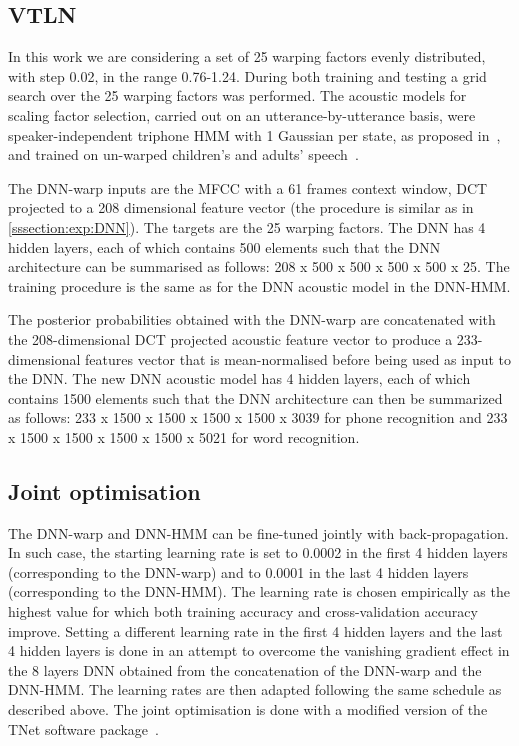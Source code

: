 \documentclass{nle}
\begin{document}
\subsection{VTLN}\label{sssection:exp:VTLN}
In  this  work  we are considering  a  set   of  25  warping   factors  evenly
distributed, with step 0.02, in the range 0.76-1.24. During both training and testing
a grid search over the 25 warping factors was performed.  The acoustic
models   for   scaling   factor    selection,   carried   out   on   an
utterance-by-utterance  basis, were speaker-independent  triphone HMM
with  1 Gaussian  per state, as proposed in~\citep{WelKanNey99},   and  trained on  un-warped children's  and
adults' speech~\citep{GerGiuBru07,GerGiuBru09}.

The DNN-warp inputs are the MFCC with a 61 frames context window, DCT
projected to a 208 dimensional feature vector (the procedure is similar as in \ref{sssection:exp:DNN}). The targets are the 25
warping factors. The  DNN has 4 hidden layers,  each of which contains
500  elements such  that the  DNN  architecture can  be summarised  as
follows: 208 x 500  x 500 x 500 x 500 x  25. The training procedure is
the same as for the DNN  acoustic model in the DNN-HMM.  

The posterior
probabilities  obtained with  the  DNN-warp are concatenated with  the
208-dimensional DCT  projected acoustic  feature vector to produce a
233-dimensional features  vector that is mean-normalised  before being used
as input to  the DNN. The new DNN acoustic model  has 4 hidden layers,
each of  which contains 1500  elements such that the  DNN architecture
can then be summarized  as follows: 233 x 1500 x 1500  x 1500 x 1500 x
3039 for phone recognition and 233 x 1500 x 1500  x 1500 x 1500 x 5021 for word recognition.

\subsection{Joint optimisation}\label{sssection:exp:joint}
The DNN-warp and DNN-HMM can be fine-tuned jointly with back-propagation. In such case, the starting learning rate is set to 0.0002 in the first 4 hidden layers (corresponding to the DNN-warp) and to 0.0001 in the last 4 hidden layers (corresponding to the DNN-HMM). The learning rate is chosen empirically as the highest value for which both training accuracy and cross-validation accuracy improve. Setting a different learning rate in the first 4 hidden layers and the last 4 hidden layers is done in an attempt to overcome the vanishing gradient effect in the 8 layers DNN obtained from the concatenation of the DNN-warp and the DNN-HMM. The learning rates are then adapted following the same schedule as described above. The joint optimisation is done with a modified version of the TNet software package~\citep{vesely10}.
\end{document}

